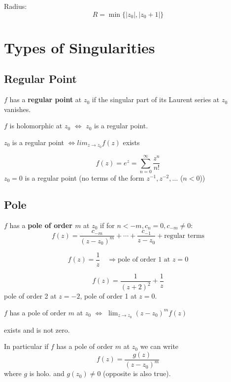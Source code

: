 Radius:
\[
R = \min\{|z_0|, |z_0 + 1|\}
\]

\section{Types of Singularities}

\subsection{Regular Point}

\begin{definition}
$f$ has a \textbf{regular point} at $z_0$ if the singular part of its Laurent series at $z_0$ vanishes.
\end{definition}

\begin{remark}
$f$ is holomorphic at $z_0$ $\iff$ $z_0$ is a regular point.

$z_0$ is a regular point $\iff lim_{z \to z_0} f(z)$ exists
\end{remark}

\begin{example}
\[
f(z) = e^z = \sum_{n=0}^{\infty} \frac{z^n}{n!}
\]
$z_0=0$ is a regular point (no terms of the form $z^{-1}, z^{-2}, \dots$ ($n < 0$))
\end{example}

\subsection{Pole}

\begin{definition}
$f$ has a \textbf{pole of order $m$} at $z_0$ if for $n < -m, c_n = 0, c_{-m}\neq 0$:
\[
f(z) = \frac{c_{-m}}{(z-z_0)^m} + \cdots + \frac{c_{-1}}{z-z_0} + \text{regular terms}
\]
\end{definition}

\begin{example}
\[
f(z) = \frac{1}{z} \quad \Rightarrow \text{pole of order 1 at } z=0
\]

\[
f(z) = \frac{1}{(z+2)^2} + \frac{1}{z}
\]
pole of order 2 at $z=-2$, pole of order 1 at $z=0$.
\end{example}

\begin{remark}
$f$ has a pole of order $m$ at $z_0$ $\iff$ $\lim_{z \to z_0} (z-z_0)^m f(z)$

exists and is not zero.
\end{remark}
In particular if $f$ has a pole of order $m$ at $z_0$ we can write \[
  f(z) = \frac{g(z)}{(z-z_0)^m}
\] 
where $g$ is holo. and $g(z_0) \neq 0$ (opposite is also true).

